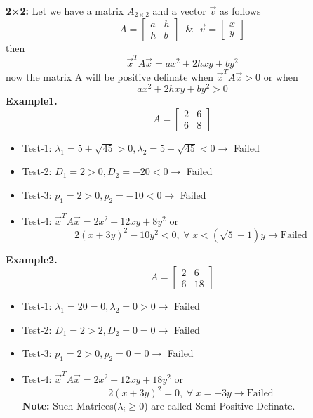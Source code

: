 \documentclass[a4paper,11pt]{article}
\numberwithin{equation}{section}
\begin{document}
\begin{itemize}
\textbf{2×2: }Let we have a matrix $A_{2\times 2}$ and a vector $\vec{v}$ as follows 
\[A=
\begin{bmatrix}
    a&h\\h&b
\end{bmatrix} \hspace{7pt} \& \hspace{7pt} \vec{v}=\begin{bmatrix}
    x\\y
\end{bmatrix}
\]
then 
\[
    \vec{x}^TA\vec{x}=ax^2+2hxy+by^2
\]
now the matrix A will be positive definate when $\vec{x}^TA\vec{x}>0$ or when
\[ax^2+2hxy+by^2>0
\]
\textbf{Example1.}
\[
A=\begin{bmatrix}
    2&6\\6&8
\end{bmatrix}
\]
\begin{itemize}
    \item Test-1: $\lambda_1=5+\sqrt{45}>0,\lambda_2=5-\sqrt{45}<0\rightarrow$  Failed
    \item Test-2: $D_1=2>0,D_2=-20<0\rightarrow$ Failed
    \item Test-3: $p_1=2>0,p_2=-10<0\rightarrow$ Failed
    \item Test-4: $\vec{x}^TA\vec{x}=2x^2+12xy+8y^2$ or 
    \[2(x+3y)^2-10y^2<0, \hspace{3pt} \forall \hspace{3pt} x<(\sqrt{5}-1)y \rightarrow \text{Failed}\]
\end{itemize}
\textbf{Example2.}
\[
A=\begin{bmatrix}
    2&6\\6&18
\end{bmatrix}
\]
\begin{itemize}
    \item Test-1: $\lambda_1=20=0,\lambda_2=0>0\rightarrow$  Failed
    \item Test-2: $D_1=2>2,D_2=0=0\rightarrow$ Failed
    \item Test-3: $p_1=2>0,p_2=0=0\rightarrow$ Failed
    \item Test-4: $\vec{x}^TA\vec{x}=2x^2+12xy+18y^2$ or 
    \[2(x+3y)^2=0, \hspace{3pt} \forall \hspace{3pt} x=-3y \rightarrow \text{Failed}\]
\textbf{Note: }Such Matrices($\lambda_i \geq 0$) are called {Semi-Positive Definate}.
\end{itemize}


\end{itemize}
\end{document}
